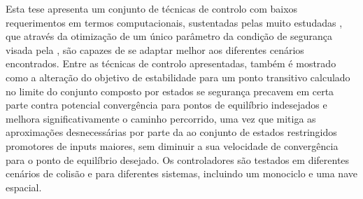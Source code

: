 
%

Esta tese apresenta um conjunto de técnicas de controlo com baixos requerimentos em termos computacionais, sustentadas pelas muito estudadas , que através da otimização de um único parâmetro da condição de segurança visada pela , são capazes de se adaptar melhor aos diferentes cenários encontrados. Entre as técnicas de controlo apresentadas, também é mostrado como a alteração do objetivo de estabilidade para um ponto transitivo calculado no limite do conjunto composto por estados se segurança precavem em certa parte contra potencial convergência para pontos de equilíbrio indesejados e melhora significativamente o caminho percorrido, uma vez que mitiga as aproximações desnecessárias por parte da  ao conjunto de estados restringidos promotores de inputs maiores, sem diminuir a sua velocidade de convergência para o ponto de equilíbrio desejado. Os controladores são testados em diferentes cenários de colisão e para diferentes sistemas, incluindo um monociclo e uma nave espacial. 



